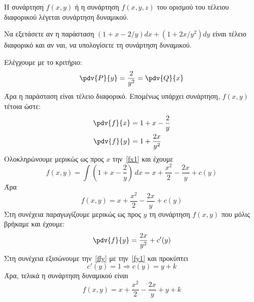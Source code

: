 \documentclass[a4paper,table]{report}
\begin{document}
\begin{rem}
  Η συνάρτηση $ f(x,y) $ ή η συνάρτηση $ f(x,y,z) $ του ορισμού του τέλειου διαφορικού
  λέγεται \textcolor{Col2}{συνάρτηση δυναμικού}.
\end{rem}

\begin{example}
  Να εξετάσετε αν η παράσταση $ \left(1+x- {2}/{y}\right)dx + 
  \left(1+ {2x}/{y^{2}} \right)dy $ είναι τέλειο διαφορικό και αν ναι, να 
  υπολογίσετε τη συνάρτηση δυναμικού.
\end{example}
\begin{solution}
  Ελέγχουμε με το κριτήριο:
  \[ 
    \pdv{P}{y} = \frac{2}{y^{2}} = \pdv{Q}{x} 
  \]
  Άρα η παράσταση είναι τέλειο διαφορικό. Επομένως υπάρχει 
  συνάρτηση, $ f(x,y) $ τέτοια ώστε: 
  \begin{align}
    \pdv{f}{x} &= 1 + x - \frac{2}{y} \label{fx1} \\
    \pdv{f}{y} &= 1+ \frac{2x}{y^{2}} \label{fy1}
  \end{align}
  Ολοκληρώνουμε μερικώς ως προς $x$ την~\eqref{fx1} και έχουμε
  \[
    f(x,y) = \int \left(1+x- \frac{2}{y}\right) \,{dx} = x + 
    \frac{x^{2}}{2} - \frac{2x}{y} + c(y) 
  \] 
  Άρα  
  \begin{equation}
    f(x,y) = x + \frac{x^{2}}{2} - \frac{2x}{y} + c(y) \label{fxy}
  \end{equation}
  Στη συνέχεια παραγωγίζουμε μερικώς ως προς $y$ τη συνάρτηση $ f(x,y) $ που μόλις 
  βρήκαμε και έχουμε:
  \begin{equation}
    \pdv{f}{y} = \frac{2x}{y^{2}} + c'(y) \label{ffy}
  \end{equation} 
  Στη συνέχεια εξισώνουμε την~\eqref{ffy} με την~\eqref{fy1} και προκύπτει
  \[
    c'(y) = 1 \Rightarrow c(y) = y + k 
  \] 
  Άρα, τελικά η συνάρτηση δυναμικού είναι 
  \[
    f(x,y) = x + \frac{x^{2}}{2} - \frac{2x}{y} + y + k 
  \] 
\end{solution}
\end{document}
